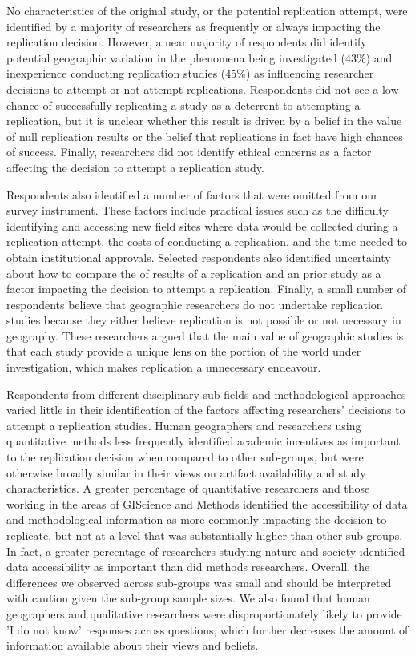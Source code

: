 \documentclass[]{interact}
\theoremstyle{plain}%
\theoremstyle{definition}
\theoremstyle{remark}
\begin{document}
No characteristics of the original study, or the potential replication attempt, were identified by a majority of researchers as frequently or always impacting the replication decision. 
However, a near majority of respondents did identify potential geographic variation in the phenomena being investigated (43\%) and inexperience conducting replication studies (45\%) as influencing researcher decisions to attempt or not attempt replications. 
Respondents did not see a low chance of successfully replicating a study as a deterrent to attempting a replication, but it is unclear whether this result is driven by a belief in the value of null replication results or the belief that replications in fact have high chances of success.
Finally, researchers did not identify ethical concerns as a factor affecting the decision to attempt a replication study. 

Respondents also identified a number of factors that were omitted from our survey instrument. 
These factors include practical issues such as the difficulty identifying and accessing new field sites where data would be collected during a replication attempt, the costs of conducting a replication, and the time needed to obtain institutional approvals.
Selected respondents also identified uncertainty about how to compare the  of results of a replication and an prior study as a factor impacting the decision to attempt a replication. 
Finally, a small number of respondents believe that geographic researchers do not undertake replication studies because they either believe replication is not possible or not necessary in geography. 
These researchers argued that the main value of geographic studies is that each study provide a unique lens on the portion of the world under investigation, which makes replication a unnecessary endeavour.   

Respondents from different disciplinary sub-fields and methodological approaches varied little in their identification of the factors affecting researchers' decisions to attempt a replication studies. 
Human geographers and researchers using quantitative methods less frequently identified academic incentives as important to the replication decision when compared to other sub-groups, but were otherwise broadly similar in their views on artifact availability and study characteristics. 
A greater percentage of quantitative researchers and those working in the areas of GIScience and Methods identified the accessibility of data and methodological information as more commonly impacting the decision to replicate, but not at a level that was substantially higher than other sub-groups. 
In fact, a greater percentage of researchers studying nature and society identified data accessibility as important than did methods researchers.  
Overall, the differences we observed across sub-groups was small and should be interpreted with caution given the sub-group sample sizes.
We also found that human geographers and qualitative researchers were disproportionately likely to provide 'I do not know' responses across questions,  
which further decreases the amount of information available about their views and beliefs. 
\end{document}
